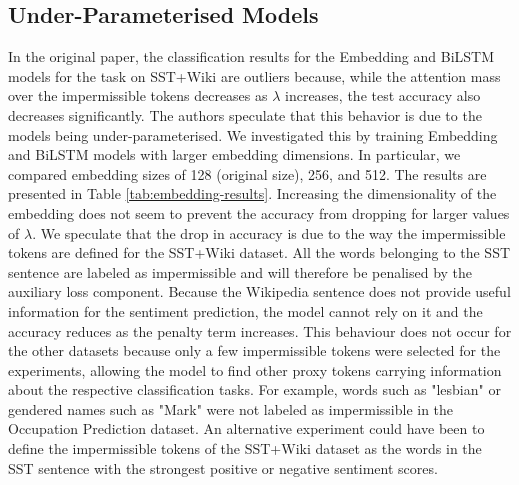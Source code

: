\subsection{Under-Parameterised Models}
In the original paper, the classification results for the Embedding and BiLSTM models for the task on SST+Wiki are outliers because, while the attention mass over the impermissible tokens decreases as $\lambda$ increases, the test accuracy also decreases significantly. The authors speculate that this behavior is due to the models being under-parameterised. We investigated this by training Embedding and BiLSTM models with larger embedding dimensions. In particular, we compared embedding sizes of 128 (original size), 256, and 512. The results are presented in Table \ref{tab:embedding-results}. Increasing the dimensionality of the embedding does not seem to prevent the accuracy from dropping for larger values of $\lambda$. We speculate that the drop in accuracy is due to the way the impermissible tokens are defined for the SST+Wiki dataset. All the words belonging to the SST sentence are labeled as impermissible and will therefore be penalised by the auxiliary loss component. Because the Wikipedia sentence does not provide useful information for the sentiment prediction, the model cannot rely on it and the accuracy reduces as the penalty term increases. This behaviour does not occur for the other datasets because only a few impermissible tokens were selected for the experiments, allowing the model to find other proxy tokens carrying information about the respective classification tasks. For example, words such as "lesbian" or gendered names such as "Mark" were not labeled as impermissible in the Occupation Prediction dataset. An alternative experiment could have been to define the impermissible tokens of the SST+Wiki dataset as the words in the SST sentence with the strongest positive or negative sentiment scores.

